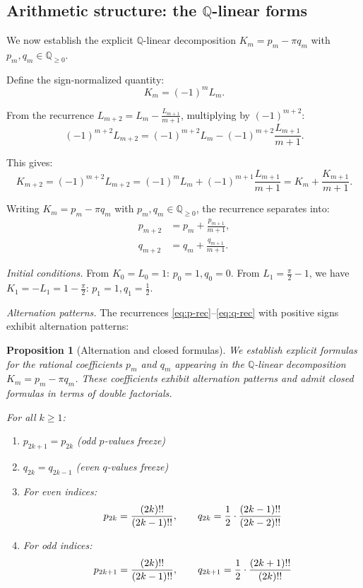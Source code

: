 \documentclass[11pt,reqno]{amsart}
\newtheorem{proposition}[theorem]{Proposition}
\theoremstyle{definition}
\newcommand{\Q}{\mathbb{Q}}
\numberwithin{equation}{section}
\begin{document}
\subsection{Arithmetic structure: the $\Q$-linear forms}

We now establish the explicit $\Q$-linear decomposition $K_m = p_m - \pi q_m$ with $p_m, q_m \in \Q_{\ge 0}$.

Define the sign-normalized quantity:
$$K_m = (-1)^m L_m.$$

From the recurrence $L_{m+2} = L_m - \frac{L_{m+1}}{m+1}$, multiplying by $(-1)^{m+2}$:
$$(-1)^{m+2}L_{m+2} = (-1)^{m+2}L_m - (-1)^{m+2}\frac{L_{m+1}}{m+1}.$$

This gives:
$$K_{m+2} = (-1)^{m+2}L_{m+2} = (-1)^m L_m + (-1)^{m+1} \frac{L_{m+1}}{m+1} = K_m + \frac{K_{m+1}}{m+1}.$$

Writing $K_m = p_m - \pi q_m$ with $p_m, q_m \in \Q_{\ge 0}$, the recurrence separates into:
\begin{align}
p_{m+2} &= p_m + \frac{p_{m+1}}{m+1}, \label{eq:p-rec}\\
q_{m+2} &= q_m + \frac{q_{m+1}}{m+1}. \label{eq:q-rec}
\end{align}

\textit{Initial conditions.} From $K_0 = L_0 = 1$: $p_0 = 1, q_0 = 0$. From $L_1 = \frac{\pi}{2} - 1$, we have $K_1 = -L_1 = 1 - \frac{\pi}{2}$: $p_1 = 1, q_1 = \frac{1}{2}$.

\textit{Alternation patterns.} The recurrences \eqref{eq:p-rec}--\eqref{eq:q-rec} with positive signs exhibit alternation patterns:

\begin{proposition}[Alternation and closed formulas]\label{prop:pq-formulas}
We establish explicit formulas for the rational coefficients $p_m$ and $q_m$ appearing in the $\Q$-linear decomposition $K_m = p_m - \pi q_m$. These coefficients exhibit alternation patterns and admit closed formulas in terms of double factorials.

For all $k \geq 1$:
\begin{enumerate}[label=(\roman*)]
\item $p_{2k+1} = p_{2k}$ (odd $p$-values freeze)
\item $q_{2k} = q_{2k-1}$ (even $q$-values freeze)
\item For even indices:
$$p_{2k} = \frac{(2k)\mskip-3mu\mathop{!!}}{(2k-1)\mskip-3mu\mathop{!!}}, \qquad q_{2k} = \frac{1}{2}\cdot\frac{(2k-1)\mskip-3mu\mathop{!!}}{(2k-2)\mskip-3mu\mathop{!!}}$$
\item For odd indices:
$$p_{2k+1} = \frac{(2k)\mskip-3mu\mathop{!!}}{(2k-1)\mskip-3mu\mathop{!!}}, \qquad q_{2k+1} = \frac{1}{2}\cdot\frac{(2k+1)\mskip-3mu\mathop{!!}}{(2k)\mskip-3mu\mathop{!!}}$$
\end{enumerate}
\end{proposition}
\end{document}
